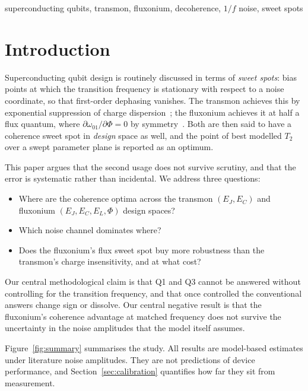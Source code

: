 \documentclass[journal]{IEEEtran}
\begin{document}
\begin{IEEEkeywords}
superconducting qubits, transmon, fluxonium, decoherence, $1/f$ noise, sweet spots
\end{IEEEkeywords}

\section{Introduction}

Superconducting qubit design is routinely discussed in terms of \emph{sweet spots}:
bias points at which the transition frequency is stationary with respect to a noise
coordinate, so that first-order dephasing vanishes. The transmon achieves this by
exponential suppression of charge dispersion~\cite{koch2007}; the fluxonium achieves it at
half a flux quantum, where $\partial\omega_{01}/\partial\Phi = 0$ by
symmetry~\cite{manucharyan2009,nguyen2019}. Both are then said to have a coherence sweet
spot in \emph{design} space as well, and the point of best modelled $T_2$ over a swept
parameter plane is reported as an optimum.

This paper argues that the second usage does not survive scrutiny, and that the error is
systematic rather than incidental. We address three questions:

\begin{itemize}
\item[\textbf{Q1}] Where are the coherence optima across the transmon $(E_J, E_C)$ and
      fluxonium $(E_J, E_C, E_L, \Phi)$ design spaces?
\item[\textbf{Q2}] Which noise channel dominates where?
\item[\textbf{Q3}] Does the fluxonium's flux sweet spot buy more robustness than the
      transmon's charge insensitivity, and at what cost?
\end{itemize}

Our central methodological claim is that Q1 and Q3 cannot be answered without controlling
for the transition frequency, and that once controlled the conventional answers change sign
or dissolve. Our central negative result is that the fluxonium's coherence advantage at
matched frequency does not survive the uncertainty in the noise amplitudes that the model
itself assumes.

Figure~\ref{fig:summary} summarises the study. All results are model-based estimates under
literature noise amplitudes. They are not predictions of device performance, and
Section~\ref{sec:calibration} quantifies how far they sit from measurement.
\end{document}
